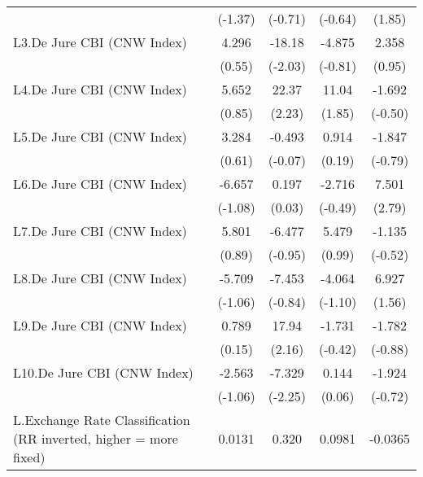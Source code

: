 {\begin{longtable}{l*{4}{c}}
                &  (-1.37)         &  (-0.71)         &  (-0.64)         &   (1.85)         \\
[1em]
L3.De Jure CBI (CNW Index)&    4.296         &   -18.18\sym{*}  &   -4.875         &    2.358         \\
                &   (0.55)         &  (-2.03)         &  (-0.81)         &   (0.95)         \\
[1em]
L4.De Jure CBI (CNW Index)&    5.652         &    22.37\sym{*}  &    11.04         &   -1.692         \\
                &   (0.85)         &   (2.23)         &   (1.85)         &  (-0.50)         \\
[1em]
L5.De Jure CBI (CNW Index)&    3.284         &   -0.493         &    0.914         &   -1.847         \\
                &   (0.61)         &  (-0.07)         &   (0.19)         &  (-0.79)         \\
[1em]
L6.De Jure CBI (CNW Index)&   -6.657         &    0.197         &   -2.716         &    7.501\sym{**} \\
                &  (-1.08)         &   (0.03)         &  (-0.49)         &   (2.79)         \\
[1em]
L7.De Jure CBI (CNW Index)&    5.801         &   -6.477         &    5.479         &   -1.135         \\
                &   (0.89)         &  (-0.95)         &   (0.99)         &  (-0.52)         \\
[1em]
L8.De Jure CBI (CNW Index)&   -5.709         &   -7.453         &   -4.064         &    6.927         \\
                &  (-1.06)         &  (-0.84)         &  (-1.10)         &   (1.56)         \\
[1em]
L9.De Jure CBI (CNW Index)&    0.789         &    17.94\sym{*}  &   -1.731         &   -1.782         \\
                &   (0.15)         &   (2.16)         &  (-0.42)         &  (-0.88)         \\
[1em]
L10.De Jure CBI (CNW Index)&   -2.563         &   -7.329\sym{*}  &    0.144         &   -1.924         \\
                &  (-1.06)         &  (-2.25)         &   (0.06)         &  (-0.72)         \\
[1em]
L.Exchange Rate Classification (RR inverted, higher = more fixed)&   0.0131         &    0.320         &   0.0981         &  -0.0365         \\

\end{longtable}}
